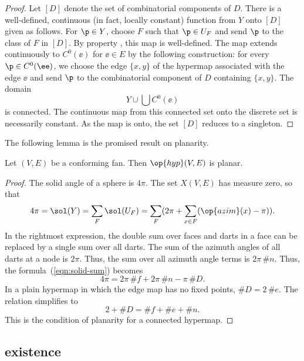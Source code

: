 \begin{proof} Let $[D]$ denote the set of combinatorial components of
  $D$.  There is a well-defined, continuous (in fact, locally
  constant) function from $Y$ onto $[D]$ given as follows.  For $\p\in
  Y$, choose $F$ such that $\p\in U_F$ and send $\p$ to the class of
  $F$ in $[D]$.  By property , this map is
  well-defined.  The map extends continuously to $C^0(\ee)$ for
  $\ee\in E$ by the following construction: for every $\p\in
  C^0(\ee)$, we choose the edge $\{x,y\}$ of the hypermap associated
  with the edge $\ee$ and send $\p$ to the combinatorial component of
  $D$ containing $\{x,y\}$. The domain
\[ 
Y\cup \bigcup C^0(\ee)
\] 
is connected.  The continuous map from this connected set onto the
discrete set is necessarily constant.  As the map is onto, the set
$[D]$ reduces to a singleton.
\end{proof}

The following lemma is the promised result on planarity.

\begin{lemma}[]  
\label{lemma:cfplanar}
Let $(V,E)$ be a conforming fan.  
Then $\op{hyp}(V,E)$ is planar.
\end{lemma}
%
%

\begin{proof}  The solid angle of a sphere is $4\pi$.  The set $X(V,E)$
has measure zero, so that
\begin{equation}\label{eqn:solid-sum}
4\pi = \sol(Y)= \sum_F \sol(U_F) = 
\sum_F ( 2\pi + \sum_{x\in F} (\op{azim}(x)-\pi) ).
\end{equation}
In the rightmost expression, the double sum over faces and darts in a
face can be replaced by a single sum over all darts.  The sum of the
azimuth angles of all darts at a node is $2\pi$. Thus, the sum over all azimuth
angle terms is $2\pi\,\#n$.  Thus, the formula~(\ref{eqn:solid-sum})
becomes
\[ 
4\pi = 2\pi\, \#f +2\pi\,\#n - \pi\, \#D.
\] 
In a plain hypermap in which the edge map has no fixed points, $\#D =
2\,\#e$.  The relation  simplifies to
\[ 
2 + \#D = \#f + \#e + \#n.
\] 
This is the condition of planarity for a connected hypermap.
\end{proof}
%

\subsection{existence}




